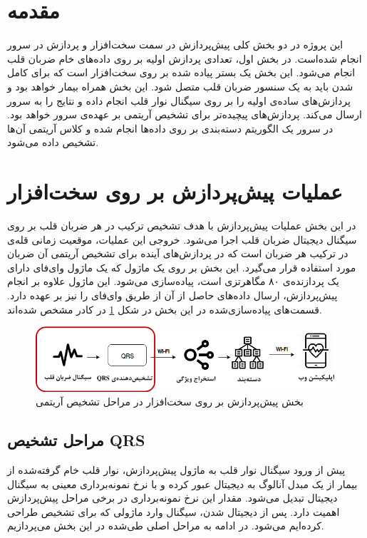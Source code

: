 
\pagebreak

\section{مقدمه}
 این پروژه در دو بخش کلی پیش‌پردازش در سمت سخت‌افزار و پردازش در سرور انجام شده‌است. در بخش اول، تعدادی پردازش اولیه بر روی داده‌های خام ضربان قلب انجام می‌شود. این بخش یک بستر پیاده شده بر روی سخت‌افزار است که برای کامل شدن باید به یک سنسور ضربان قلب متصل شود. این بخش همراه بیمار خواهد بود و پردازش‌های ساده‌ی اولیه را بر روی سیگنال نوار قلب انجام داده و نتایج را به سرور ارسال می‌کند.  پردازش‌های پیچیده‌تر برای تشخیص آریتمی بر عهده‌ی سرور خواهد بود. در سرور یک الگوریتم دسته‌بندی بر روی داده‌ها انجام شده و کلاس آریتمی آن‌ها تشخیص داده می‌شود.

\section{عملیات پیش‌پردازش بر روی سخت‌افزار} 
در این بخش عملیات پیش‌پردازش با هدف تشخیص ترکیب  در هر ضربان قلب بر روی سیگنال دیجیتال ضربان قلب اجرا می‌شود. خروجی این عملیات، موقعیت زمانی قله‌ی  در ترکیب  هر ضربان است که در پردازش‌های آینده برای تشخیص آریتمی آن ضربان مورد استفاده قرار می‌گیرد. این بخش بر روی یک ماژول  که یک ماژول وای‌فای دارای یک پردازنده‌ی ۸۰ مگاهرتزی است، پیاده‌سازی می‌شود. این ماژول علاوه بر انجام پیش‌پردازش، ارسال داده‌‌های حاصل از آن از طریق وای‌فای را نیز بر عهده دارد. قسمت‌های پیاده‌سازی‌شده در این بخش در شکل \ref{fig:preprocessing} در کادر مشخص شده‌اند.
\begin{figure}[!htb]
\centering
\includegraphics[width=16cm]{Figures/preprocessing.png}
\caption{بخش پیش‌پردازش بر روی سخت‌افزار در مراحل تشخیص آریتمی}
\label{fig:preprocessing}
\end{figure}
	\subsection{مراحل تشخیص QRS}

	پیش از ورود سیگنال نوار قلب به ماژول پیش‌پردازش، نوار قلب خام گرفته‌شده از بیمار  از یک مبدل آنالوگ به دیجیتال عبور کرده و با نرخ نمونه‌برداری معینی به سیگنال دیجیتال تبدیل می‌شود. مقدار این نرخ نمونه‌برداری در برخی مراحل پیش‌پردازش اهمیت دارد. 
پس از دیجیتال شدن، سیگنال وارد ماژولی که برای تشخیص  طراحی کرده‌ایم می‌شود. در ادامه به مراحل اصلی طی‌شده در این بخش می‌پردازیم.

